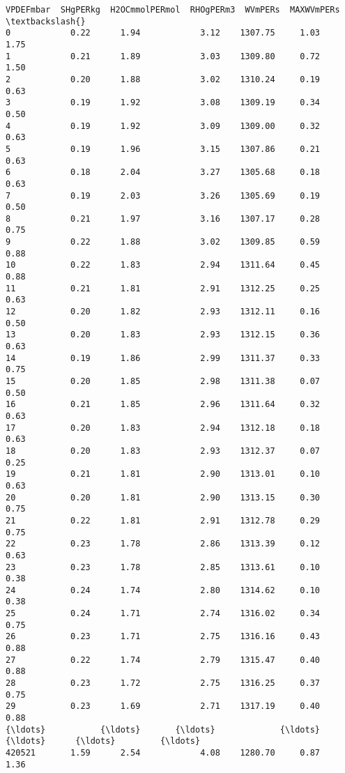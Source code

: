 \documentclass[11pt]{article}
\begin{document}
\begin{Verbatim}[commandchars=\\\{\}]
        VPDEFmbar  SHgPERkg  H2OCmmolPERmol  RHOgPERm3  WVmPERs  MAXWVmPERs  \textbackslash{}
0            0.22      1.94            3.12    1307.75     1.03        1.75   
1            0.21      1.89            3.03    1309.80     0.72        1.50   
2            0.20      1.88            3.02    1310.24     0.19        0.63   
3            0.19      1.92            3.08    1309.19     0.34        0.50   
4            0.19      1.92            3.09    1309.00     0.32        0.63   
5            0.19      1.96            3.15    1307.86     0.21        0.63   
6            0.18      2.04            3.27    1305.68     0.18        0.63   
7            0.19      2.03            3.26    1305.69     0.19        0.50   
8            0.21      1.97            3.16    1307.17     0.28        0.75   
9            0.22      1.88            3.02    1309.85     0.59        0.88   
10           0.22      1.83            2.94    1311.64     0.45        0.88   
11           0.21      1.81            2.91    1312.25     0.25        0.63   
12           0.20      1.82            2.93    1312.11     0.16        0.50   
13           0.20      1.83            2.93    1312.15     0.36        0.63   
14           0.19      1.86            2.99    1311.37     0.33        0.75   
15           0.20      1.85            2.98    1311.38     0.07        0.50   
16           0.21      1.85            2.96    1311.64     0.32        0.63   
17           0.20      1.83            2.94    1312.18     0.18        0.63   
18           0.20      1.83            2.93    1312.37     0.07        0.25   
19           0.21      1.81            2.90    1313.01     0.10        0.63   
20           0.20      1.81            2.90    1313.15     0.30        0.75   
21           0.22      1.81            2.91    1312.78     0.29        0.75   
22           0.23      1.78            2.86    1313.39     0.12        0.63   
23           0.23      1.78            2.85    1313.61     0.10        0.38   
24           0.24      1.74            2.80    1314.62     0.10        0.38   
25           0.24      1.71            2.74    1316.02     0.34        0.75   
26           0.23      1.71            2.75    1316.16     0.43        0.88   
27           0.22      1.74            2.79    1315.47     0.40        0.88   
28           0.23      1.72            2.75    1316.25     0.37        0.75   
29           0.23      1.69            2.71    1317.19     0.40        0.88   
{\ldots}           {\ldots}       {\ldots}             {\ldots}        {\ldots}      {\ldots}         {\ldots}   
420521       1.59      2.54            4.08    1280.70     0.87        1.36   

\end{Verbatim}
\end{document}
